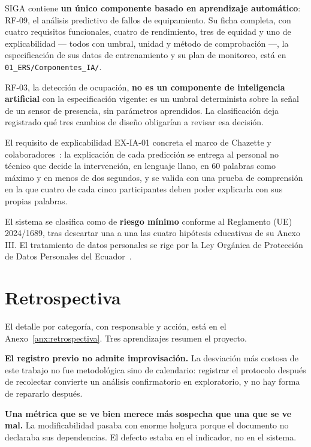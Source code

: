\documentclass[11pt,a4paper]{article}
\begin{document}
SIGA contiene \textbf{un \'unico componente basado en aprendizaje autom\'atico}: RF-09,
el an\'alisis predictivo de fallos de equipamiento. Su ficha completa, con cuatro
requisitos funcionales, cuatro de rendimiento, tres de equidad y uno de explicabilidad
--- todos con umbral, unidad y m\'etodo de comprobaci\'on ---, la especificaci\'on de sus
datos de entrenamiento y su plan de monitoreo, est\'a en
\texttt{01\_ERS/Componentes\_IA/}.

RF-03, la detecci\'on de ocupaci\'on, \textbf{no es un componente de inteligencia
artificial} con la especificaci\'on vigente: es un umbral determinista sobre la se\~nal
de un sensor de presencia, sin par\'ametros aprendidos. La clasificaci\'on deja
registrado qu\'e tres cambios de dise\~no obligar\'ian a revisar esa decisi\'on.

El requisito de explicabilidad EX-IA-01 concreta el marco de Chazette y
colaboradores~\cite{chazette2020explainability,chazette2022explainable}: la explicaci\'on
de cada predicci\'on se entrega al personal no t\'ecnico que decide la intervenci\'on, en
lenguaje llano, en 60 palabras como m\'aximo y en menos de dos segundos, y se valida con
una prueba de comprensi\'on en la que cuatro de cada cinco participantes deben poder
explicarla con sus propias palabras.

El sistema se clasifica como de \textbf{riesgo m\'inimo} conforme al Reglamento (UE)
2024/1689, tras descartar una a una las cuatro hip\'otesis educativas de su Anexo III.
El tratamiento de datos personales se rige por la Ley Org\'anica de Protecci\'on de Datos
Personales del Ecuador~\cite{asamblea2021lopdp}.

\section{Retrospectiva}

El detalle por categor\'ia, con responsable y acci\'on, est\'a en el
Anexo~\ref{anx:retrospectiva}. Tres aprendizajes resumen el proyecto.

\textbf{El registro previo no admite improvisaci\'on.} La desviaci\'on m\'as costosa de
este trabajo no fue metodol\'ogica sino de calendario: registrar el protocolo despu\'es
de recolectar convierte un an\'alisis confirmatorio en exploratorio, y no hay forma de
repararlo despu\'es.

\textbf{Una m\'etrica que se ve bien merece m\'as sospecha que una que se ve mal.} La
modificabilidad pasaba con enorme holgura porque el documento no declaraba sus
dependencias. El defecto estaba en el indicador, no en el sistema.
\end{document}
